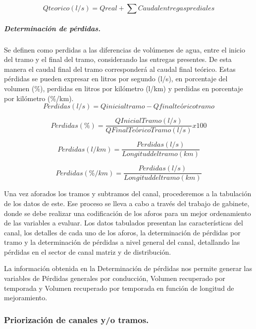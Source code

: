 \documentclass[]{article}
\begin{document}
\begin{equation}
Q teorico (l/s) = Q real + \sum{Caudal entregas prediales}
\end{equation}

\subparagraph{Determinación de pérdidas.}
Se definen como perdidas a las diferencias de volúmenes de agua, entre el inicio del tramo y el final del tramo, considerando las entregas presentes. De esta manera el caudal final del tramo corresponderá al caudal final teórico. Estas pérdidas se pueden expresar en litros por segundo (l/s), en porcentaje del volumen (\%), perdidas en litros por kilómetro (l/km) y perdidas en porcentaje por kilómetro (\%/km).\\

\begin{equation}
Perdidas (l/s) = Q inicial tramo - Q final teórico tramo 
\end{equation}

\begin{equation}
Perdidas (\%) = \frac{Q Inicial Tramo (l/s)}{ Q Final Teórico Tramo (l/s)} x 100
\end{equation}

\begin{equation}
Perdidas (l/km) = \frac{Perdidas (l/s)}{Longitud del tramo (km)}
\end{equation}

\begin{equation}
Perdidas (\%/km) = \frac{Perdidas (l/s)}{Longitud del tramo (km)}
\end{equation}

Una vez aforados los tramos y subtramos del canal, procederemos a la tabulación de los datos de este. Ese proceso se lleva a cabo a través del trabajo de gabinete, donde se debe realizar una codificación de los aforos para un mejor ordenamiento de las variables a evaluar. Los datos tabulados presentan las características del canal, los detalles de cada uno de los aforos, la determinación de pérdidas por tramo y la determinación de pérdidas a nivel general del canal, detallando las pérdidas en el sector de canal matriz y de distribución.

La información obtenida en la Determinación de pérdidas nos permite generar las variables de Pérdidas generales por conducción, Volumen recuperado por temporada y Volumen recuperado por temporada en función de longitud de mejoramiento.

\subsubsection{Priorización de canales y/o tramos.}
\end{document}
